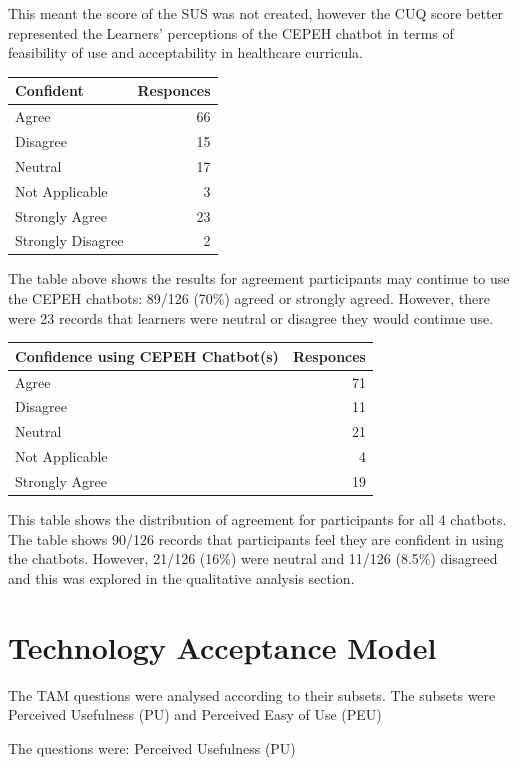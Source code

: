 \documentclass[a4paper, nobind]{templates/ociamthesis}
\begin{document}
This meant the score of the SUS was not created, however the CUQ score
better represented the Learners' perceptions of the CEPEH chatbot in
terms of feasibility of use and acceptability in healthcare curricula.

\begin{longtable}[]{@{}lr@{}}
\toprule()
Confident & Responces \\
\midrule()
\endhead
Agree & 66 \\
Disagree & 15 \\
Neutral & 17 \\
Not Applicable & 3 \\
Strongly Agree & 23 \\
Strongly Disagree & 2 \\
\bottomrule()
\end{longtable}

The table above shows the results for agreement participants may
continue to use the CEPEH chatbots: 89/126 (70\%) agreed or strongly
agreed. However, there were 23 records that learners were neutral or
disagree they would continue use.

\begin{longtable}[]{@{}lr@{}}
\toprule()
Confidence using CEPEH Chatbot(s) & Responces \\
\midrule()
\endhead
Agree & 71 \\
Disagree & 11 \\
Neutral & 21 \\
Not Applicable & 4 \\
Strongly Agree & 19 \\
\bottomrule()
\end{longtable}

This table shows the distribution of agreement for participants for all
4 chatbots. The table shows 90/126 records that participants feel they
are confident in using the chatbots. However, 21/126 (16\%) were neutral
and 11/126 (8.5\%) disagreed and this was explored in the qualitative
analysis section.

\hypertarget{technology-acceptance-model}{%
\section{Technology Acceptance Model}\label{technology-acceptance-model}}

The TAM questions were analysed according to their subsets. The subsets
were Perceived Usefulness (PU) and Perceived Easy of Use (PEU)

The questions were: Perceived Usefulness (PU)
\end{document}
